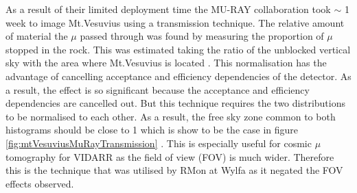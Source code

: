 \begin{figure}[!h]
\begin{minipage}{.45\textwidth}
  \label{fig:mtVesuviusMuRayImaging}
\end{minipage}
\end{figure}

As a result of their limited deployment time the MU-RAY collaboration took $\sim$ 1 week to image Mt.Vesuvius using a transmission technique. The relative amount of material the $\mu$ passed through was found by measuring the proportion of $\mu$ stopped in the rock. This was estimated taking the ratio of the unblocked vertical sky with the area where Mt.Vesuvius is located . This normalisation has the advantage of cancelling acceptance and efficiency dependencies of the detector.  As a result, the effect is so significant because the acceptance and efficiency dependencies are cancelled out. But this technique requires the two distributions to be normalised to each other. As a result, the free sky zone common to both histograms should be close to 1 which is show to be the case in figure \ref{fig:mtVesuviusMuRayTransmission} \cite{Ambrosino_2014}. This is especially useful for cosmic $\mu$ tomography for VIDARR as the field of view (FOV) is much wider. Therefore this is the technique that was utilised by RMon at Wylfa as it negated the FOV effects observed. 


